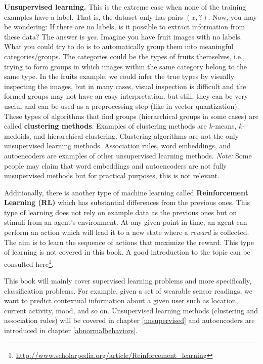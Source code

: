 \documentclass[
  11pt,
]{krantz}
\begin{document}
\begin{itemize}
  \textbf{Unsupervised learning.} This is the extreme case when none of the training examples have a label. That is, the dataset only has pairs \((x,?)\). Now, you may be wondering: If there are no labels, is it possible to extract information from these data? The answer is \emph{yes}. Imagine you have fruit images with no labels. What you could try to do is to automatically group them into meaningful categories/groups. The categories could be the types of fruits themselves, i.e., trying to form groups in which images within the same category belong to the same type. In the fruits example, we could infer the true types by visually inspecting the images, but in many cases, visual inspection is difficult and the formed groups may not have an easy interpretation, but still, they can be very useful and can be used as a preprocessing step (like in vector quantization). These types of algorithms that find groups (hierarchical groups in some cases) are called \textbf{clustering methods}. Examples of clustering methods are \(k\)-means, \(k\)-medoids, and hierarchical clustering. Clustering algorithms are not the only unsupervised learning methods. Association rules, word embeddings, and autoencoders are examples of other unsupervised learning methods. \emph{Note:} Some people may claim that word embeddings and autoencoders are not fully unsupervised methods but for practical purposes, this is not relevant.
\end{itemize}

Additionally, there is another type of machine learning called \textbf{Reinforcement Learning (RL)} which has substantial differences from the previous ones. This type of learning does not rely on example data as the previous ones but on stimuli from an agent's environment. At any given point in time, an agent can perform an action which will lead it to a new state where a \emph{reward} is collected. The aim is to learn the sequence of actions that maximize the reward. This type of learning is not covered in this book. A good introduction to the topic can be consulted here\footnote{\url{http://www.scholarpedia.org/article/Reinforcement_learning}}.

This book will mainly cover supervised learning problems and more specifically, classification problems. For example, given a set of wearable sensor readings, we want to predict contextual information about a given user such as location, current activity, mood, and so on. Unsupervised learning methods (clustering and association rules) will be covered in chapter \ref{unsupervised} and autoencoders are introduced in chapter \ref{abnormalbehaviors}.
\end{document}
